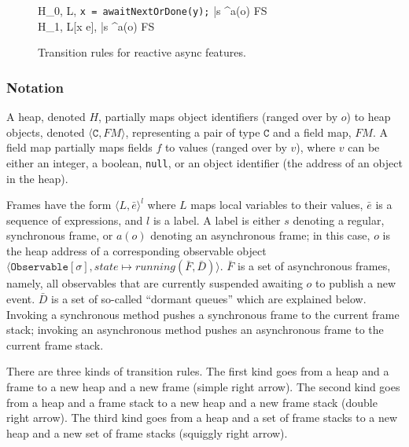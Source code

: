 \documentclass{acm_proc_article-sp}
\newcommand{\aframe}[3]{\langle #1, #2 \rangle ^{#3}}
\newcommand{\fsreducebreak}[4]{#1, #2 \\ \;\twoheadrightarrow\; #3, #4}
\begin{document}
\begin{figure*}[ht!]
\vspace{0.3cm}

{ \fsreducebreak {H_0} {\aframe L {\texttt{x = awaitNextOrDone(y);} \bar{s}} {a(o)} \circ FS}
    {H_1} {\aframe {L[x \mapsto e]} {\bar{s}} {a(o)} \circ FS}
}

  \caption{Transition rules for reactive async features.}
  \label{fig:opsem-rules}
\end{figure*}

\subsubsection{Notation}

A heap, denoted $H$, partially maps object identifiers (ranged over by $o$) to
heap objects, denoted $\langle\texttt{C}, FM\rangle$, representing a pair of
type $\texttt{C}$ and a field map, $FM$. A field map partially maps fields $f$
to values (ranged over by $v$), where $v$ can be either an integer, a boolean,
\texttt{null}, or an object identifier (the address of an object in the heap).

Frames have the form $\aframe L {\bar{e}} l$ where $L$ maps local variables to
their values, $\bar{e}$ is a sequence of expressions, and $l$ is a label. A
label is either $s$ denoting a regular, synchronous frame, or $a(o)$ denoting
an asynchronous frame; in this case, $o$ is the heap address of a
corresponding observable object $\langle \texttt{Observable$[\sigma]$}, state \mapsto
running(\bar{F}, \bar{D}) \rangle$. $\bar{F}$ is a set of asynchronous frames,
namely, all observables that are currently suspended awaiting $o$ to publish a new
event. $\bar{D}$ is a set of so-called ``dormant queues'' which are explained
below. Invoking a synchronous method pushes a synchronous frame to the current
frame stack; invoking an asynchronous method pushes an asynchronous frame to
the current frame stack.

There are three kinds of transition rules. The first kind goes from a heap and
a frame to a new heap and a new frame (simple right arrow). The second kind
goes from a heap and a frame stack to a new heap and a new frame stack (double
right arrow). The third kind goes from a heap and a set of frame stacks to a
new heap and a new set of frame stacks (squiggly right arrow).
\end{document}
